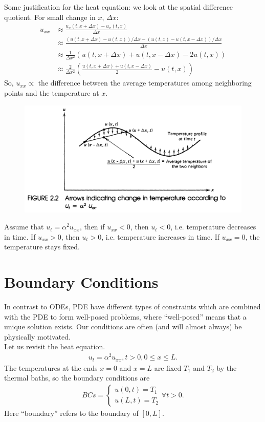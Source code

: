 \documentclass{book}
\theoremstyle{definition}
\begin{document}
Some justification for the heat equation: we look at the spatial difference quotient. For small change in $x$, $\Delta x$:
\begin{align*}
u_{xx} &\approx \frac{u_x(t,x+\Delta x) - u_x(t,x)}{\Delta x}\\
&\approx \frac{(u(t,x+\Delta x) - u(t,x))/\Delta x - (u(t,x)-u(t,x-\Delta x))/\Delta x}{\Delta x}\\
&\approx \frac{1}{\Delta x^2}(u(t,x+\Delta x) + u(t,x-\Delta x) - 2u(t,x))\\
&\approx \frac{2}{\Delta x^2}\left(\frac{u(t,x+\Delta x) + u(t,x-\Delta x)}{2} - u(t,x) \right)
\end{align*}
So, $u_{xx} \propto$ the difference between the average temperatures among neighboring points and the temperature at $x$. 
\begin{figure}[h!]
	\centering
	\includegraphics[scale=0.5]{copper1.png}
\end{figure}

Assume that $u_t = \alpha^2 u_{xx}$, then if $u_{xx} < 0$, then $u_t < 0$, i.e. temperature decreases in time. If $u_{xx} > 0$, then $u_t > 0$, i.e. temperature increases in time. If $u_{xx} = 0$, the temperature stays fixed. 

\section{Boundary Conditions}
In contrast to ODEs, PDE have different types of constraints which are combined with the PDE to form well-posed problems, where ``well-posed'' means that a unique solution exists. Our conditions are often (and will almost always) be physically motivated. \\

Let us revisit the heat equation. 
\begin{align*}
u_t = \alpha^2 u_{xx}, t> 0, 0\leq x\leq L.
\end{align*}
The temperatures at the ends $x=0$ and $x=L$ are fixed $T_1$ and $T_2$ by the thermal baths, so the boundary conditions are
\begin{align*}
BCs = \begin{cases*}
u(0,t) = T_1\\
u(L,t) = T_2
\end{cases*}
\forall t > 0.
\end{align*} 
Here ``boundary'' refers to the boundary of $[0,L]$.
\end{document}
